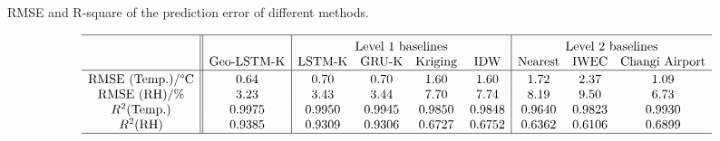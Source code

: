 \documentclass[a4paper,fleqn]{cas-sc}
\begin{document}
\begin{table}[width=.9\linewidth,pos=h] 
\caption{RMSE and R-square of the prediction error of different methods.} \label{tab:RMSE}
\centering \small
\begin{displaymath}
\begin{array}{ c || c | c  c  c  c | c  c  c }
\hline
 \rule{0pt}{12pt}
 & & \multicolumn{4}{ c |}{\text{Level 1 baselines}} & \multicolumn{3}{ c }{\text{Level 2 baselines}}\\
  &   \text{Geo-LSTM-K} &   \text{LSTM-K}   & \text{GRU-K}  & \text{Kriging} & \text{IDW}   & \text{Nearest}  & \text{IWEC} & \text{Changi Airport}  \\
\hline \rule{0pt}{10pt}
\text{RMSE (Temp.)/°C} & 0.64 & 0.70 &  0.70 & 1.60 & 1.60 & 1.72 & 2.37 & 1.09  \\
\text{RMSE (RH)/\%} & 3.23 & 3.43 & 3.44 & 7.70 & 7.74 & 8.19 & 9.50 & 6.73  \\
R^2 \text{(Temp.)} & 0.9975 & 0.9950 & 0.9945 & 0.9850 & 0.9848 & 0.9640 & 0.9823 & 0.9930  \\
R^2 \text{(RH)} & 0.9385 & 0.9309 & 0.9306 & 0.6727 & 0.6752 & 0.6362 & 0.6106 & 0.6899  \\
\hline
\end{array}
\end{displaymath}
\end{table}

\end{document}
